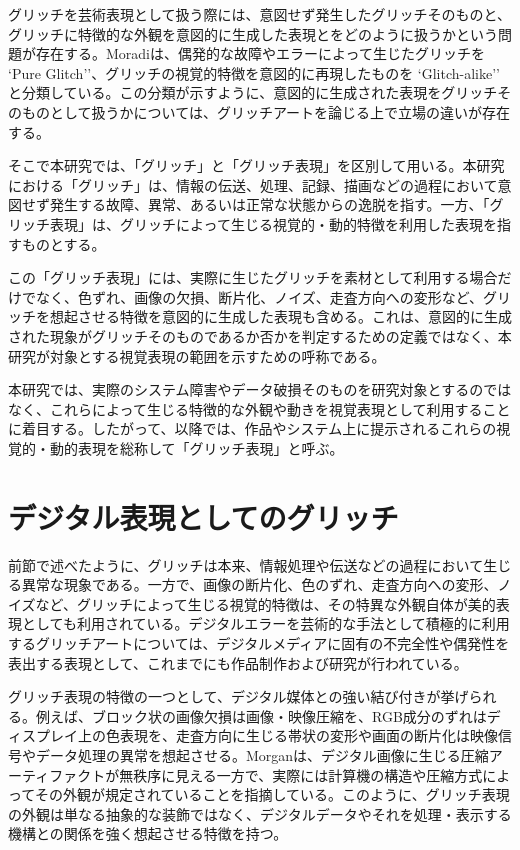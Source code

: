 グリッチを芸術表現として扱う際には、意図せず発生したグリッチそのものと、グリッチに特徴的な外観を意図的に生成した表現とをどのように扱うかという問題が存在する。Moradiは、偶発的な故障やエラーによって生じたグリッチを `Pure Glitch''、グリッチの視覚的特徴を意図的に再現したものを `Glitch-alike'' と分類している\cite{moradi2004}。この分類が示すように、意図的に生成された表現をグリッチそのものとして扱うかについては、グリッチアートを論じる上で立場の違いが存在する。

そこで本研究では、「グリッチ」と「グリッチ表現」を区別して用いる。本研究における「グリッチ」は、情報の伝送、処理、記録、描画などの過程において意図せず発生する故障、異常、あるいは正常な状態からの逸脱を指す。一方、「グリッチ表現」は、グリッチによって生じる視覚的・動的特徴を利用した表現を指すものとする。

この「グリッチ表現」には、実際に生じたグリッチを素材として利用する場合だけでなく、色ずれ、画像の欠損、断片化、ノイズ、走査方向への変形など、グリッチを想起させる特徴を意図的に生成した表現も含める。これは、意図的に生成された現象がグリッチそのものであるか否かを判定するための定義ではなく、本研究が対象とする視覚表現の範囲を示すための呼称である。

本研究では、実際のシステム障害やデータ破損そのものを研究対象とするのではなく、これらによって生じる特徴的な外観や動きを視覚表現として利用することに着目する。したがって、以降では、作品やシステム上に提示されるこれらの視覚的・動的表現を総称して「グリッチ表現」と呼ぶ。



\section{デジタル表現としてのグリッチ}

前節で述べたように、グリッチは本来、情報処理や伝送などの過程において生じる異常な現象である。一方で、画像の断片化、色のずれ、走査方向への変形、ノイズなど、グリッチによって生じる視覚的特徴は、その特異な外観自体が美的表現としても利用されている。デジタルエラーを芸術的な手法として積極的に利用するグリッチアートについては、デジタルメディアに固有の不完全性や偶発性を表出する表現として、これまでにも作品制作および研究が行われている\cite{menkman2011,morgan2019}。

グリッチ表現の特徴の一つとして、デジタル媒体との強い結び付きが挙げられる。例えば、ブロック状の画像欠損は画像・映像圧縮を、RGB成分のずれはディスプレイ上の色表現を、走査方向に生じる帯状の変形や画面の断片化は映像信号やデータ処理の異常を想起させる。Morganは、デジタル画像に生じる圧縮アーティファクトが無秩序に見える一方で、実際には計算機の構造や圧縮方式によってその外観が規定されていることを指摘している\cite{morgan2019}。このように、グリッチ表現の外観は単なる抽象的な装飾ではなく、デジタルデータやそれを処理・表示する機構との関係を強く想起させる特徴を持つ。


